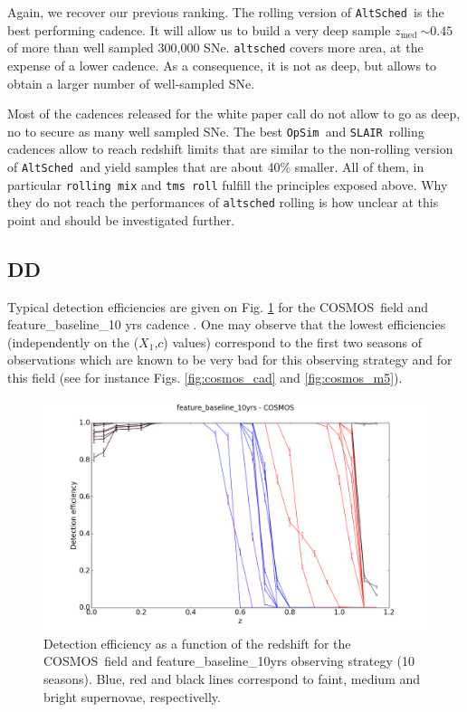 \documentclass [11pt,a4paper]{article}
\newcommand{\cosmos}{COSMOS}
\newcommand{\strech}{$X_1$}
\newcommand{\sncolor}{$c$}
\newcommand{\zmed}{$z_{\mathrm{med}}\ $}
\newcommand{\opsim}{{\tt OpSim\ }}
\newcommand{\slair}{{\tt SLAIR\ }}
\newcommand{\altsched}{{\tt AltSched\ }}
\begin{document}
Again, we recover our previous ranking.  The rolling version of
\altsched is the best performing cadence.  It will allow us to build a
very deep sample \zmed $\sim 0.45$ of more than well sampled 300,000
SNe.  {\tt altsched} covers more area, at the expense of a lower
cadence.  As a consequence, it is not as deep, but allows to obtain a
larger number of well-sampled SNe.

Most of the cadences released for the white paper call do not allow to
go as deep, no to secure as many well sampled SNe. The best \opsim and
\slair rolling cadences allow to reach redshift limits that are
similar to the non-rolling version of \altsched and yield samples that
are about 40\% smaller. All of them, in particular {\tt rolling mix}
and {\tt tms roll} fulfill the principles exposed above. Why they do
not reach the performances of {\tt altsched} rolling is how unclear at
this point and should be investigated further.




\subsection{ DD}

Typical detection efficiencies are given on Fig. \ref{fig:effi} for the \cosmos~field and feature\_baseline\_10 yrs cadence . One may observe that the lowest efficiencies (independently on the (\strech,\sncolor) values) correspond to the first two seasons of observations which are known to be very bad for this observing strategy and for this field (see for instance Figs. \ref{fig:cosmos_cad} and \ref{fig:cosmos_m5}).

\begin{figure}[htbp]
\begin{center}
  
  \includegraphics[width=12cm]{Figures/effi_feature_cosmos.png}
 \caption{Detection efficiency as a function of the redshift for the \cosmos~field and feature\_baseline\_10yrs observing strategy (10 seasons). Blue, red and black lines correspond to faint, medium and bright supernovae, respectivelly.}\label{fig:effi}
\end{center}
\end{figure}
\end{document}
